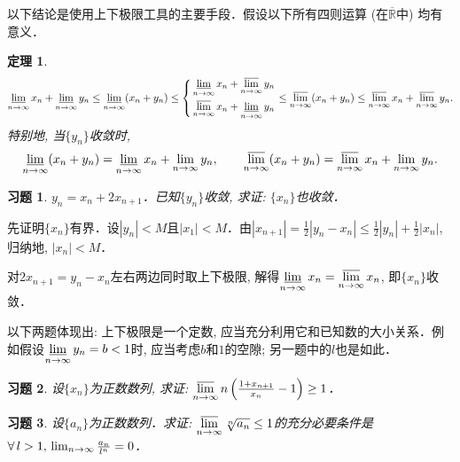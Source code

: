 \documentclass[11pt,a4paper]{ctexart}
\makeatletter
\theoremstyle{thmseries} %
\newtheorem{thm}{定理}[section]
\theoremstyle{exerseries}
\newtheorem{exer}{习题}[section]
\renewenvironment{proof}[1][\proofname]{\par
  \pushQED{\qed}%
  \normalfont \topsep6\p@\@plus6\p@\relax
  \trivlist
  \item[\hskip\labelsep
        \itshape
    #1\@addpunct{}]\ignorespaces
}{%
  \popQED\endtrivlist\@endpefalse
}
\newenvironment{pf}{\begin{proof}[\bfseries\upshape 证\quad]}{\end{proof}}
\newcommand{\bra}[1]{\mathopen{}\left(#1\right)}
\newcommand{\cbra}[1]{\mathopen{}\left\{#1\right\}}
\renewcommand{\epsilon}{\varepsilon}
\newcommand{\R}{\mathbb{R}}
\newcommand{\N}{\mathbb{N}}
\def \nti {\mathnormal{n}\to\infty}
\DeclareMathOperator{\llim}{\underset{\nti}{\underline{\lim}}}
\DeclareMathOperator{\ulim}{\underset{\nti}{\overline{\lim}}}
\makeatother
\begin{document}
以下结论是使用上下极限工具的主要手段．假设以下所有四则运算 (在$\overline{\R}$中) 均有意义．
\begin{thm}
	\[\llim x_n+\llim y_n\leq\llim\bra{x_n+y_n}\leq
	\left\{\begin{aligned}
	&\llim x_n+\ulim y_n\\
	&\ulim x_n+\llim y_n
	\end{aligned}\right.
	\leq\ulim\bra{x_n+y_n}\leq\ulim x_n+\ulim y_n.\]
	特别地, 当$\{y_n\}$收敛时,
	\[\llim\bra{x_n+y_n}=\llim x_n+\lim_{\nti} y_n,\qquad\ulim\bra{x_n+y_n}=\ulim x_n+\lim_{\nti} y_n.\]
\end{thm}

\begin{exer}
	$y_n=x_n+2x_{n+1}$．已知$\{y_n\}$收敛, 求证: $\{x_n\}$也收敛．
\end{exer}
\begin{pf}
	先证明$\{x_n\}$有界．设$|y_n|<M$且$|x_1|<M$．由$|x_{n+1}|=\frac{1}{2}|y_n-x_n|\leq\frac{1}{2}|y_n|+\frac{1}{2}|x_n|$, 归纳地, $|x_n|<M$．

	对$2x_{n+1}=y_n-x_n$左右两边同时取上下极限, 解得$\llim x_n=\ulim x_n$, 即$\{x_n\}$收敛．
\end{pf}


以下两题体现出: 上下极限是一个定数, 应当充分利用它和已知数的大小关系．例如假设$\llim y_n=b<1$时, 应当考虑$b$和$1$的空隙; 另一题中的$l$也是如此．
\begin{exer}
	设$\{x_n\}$为正数数列, 求证: $\ulim n\,\bra{\frac{1+x_{n+1}}{x_n}-1}\geq1$．
\end{exer}

\begin{exer}
	设$\{a_n\}$为正数数列．求证: $\ulim \sqrt[n]{a_n}\leq1$的充分必要条件是$\forall\,l>1,\,\lim_{\nti}\frac{a_n}{l^n}=0$．
\end{exer}
\end{document}
